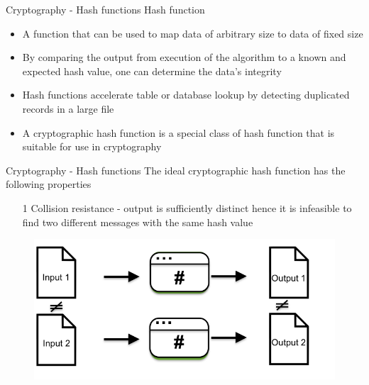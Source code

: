 \documentclass[9pt]{beamer}
\begin{document}
\begin{frame}{Cryptography - Hash functions}
	Hash function
	\begin{itemize}
		\item A function that can be used to map data of arbitrary size to data of fixed size
		\item By comparing the output from execution of the algorithm to a known and expected hash value, one can determine the data's integrity
		\item Hash functions accelerate table or database lookup by detecting duplicated records in a large file
		\item A cryptographic hash function is a special class of hash function that is suitable for use in cryptography
	\end{itemize}
\end{frame}



\begin{frame}{Cryptography - Hash functions}
	The ideal cryptographic hash function has the following properties
	\begin{enumerate}
		\item[1] Collision resistance - output is sufficiently distinct hence it is infeasible to find two different messages with the same hash value
	\end{enumerate}
	\begin{figure}[]
		\centering
		\includegraphics  [scale=0.3]{Images/hash1}
		\begin{centering}
		\end{centering}
	\end{figure}
\end{frame}

\end{document}
